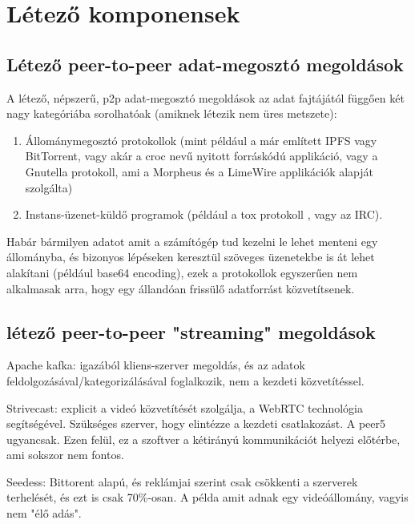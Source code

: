 \chapter{L\'{e}tez\H{o} komponensek}

\section{Létező peer-to-peer adat-megosztó megoldások}

A létező, népszerű, p2p adat-megosztó megoldások az adat fajtájától
függően két nagy kategóriába sorolhatóak (amiknek létezik nem üres metszete):
\begin{enumerate}
\item Állománymegosztó protokollok
(mint például a már említett IPFS \citep{Benet} vagy BitTorrent, vagy akár a croc nevű
nyitott forráskódú applikáció, vagy a Gnutella protokoll, ami a Morpheus
és a LimeWire applikációk alapját szolgálta)
\item Instans-üzenet-küldő
programok (például a tox protokoll \citep{enwiki:1159250538}, vagy az IRC).
\end{enumerate}

Habár bármilyen adatot amit a számítógép tud kezelni le lehet menteni egy
állományba, és bizonyos lépéseken keresztül szöveges üzenetekbe is át
lehet alakítani (például base64 encoding), ezek a protokollok egyszerűen
nem alkalmasak arra, hogy egy állandóan frissülő adatforrást
közvetítsenek.

\section{létező peer-to-peer "streaming" megoldások}

Apache kafka: igazából kliens-szerver megoldás, és az adatok
feldolgozásával/kategorizálásával foglalkozik, nem a kezdeti
közvetítéssel.

Strivecast\citep{st}: explicit a videó közvetítését szolgálja, a
WebRTC technológia segítségével. Szükséges szerver, hogy elintézze a
kezdeti csatlakozást. A peer5 ugyancsak. Ezen felül, ez a szoftver a
kétirányú kommunikációt helyezi előtérbe, ami sokszor nem fontos.

Seedess\citep{seed}: Bittorent alapú, és reklámjai szerint csak csökkenti a szerverek
terhelését, és ezt is csak 70\%-osan. A példa amit adnak egy
videóállomány, vagyis nem "élő adás".
